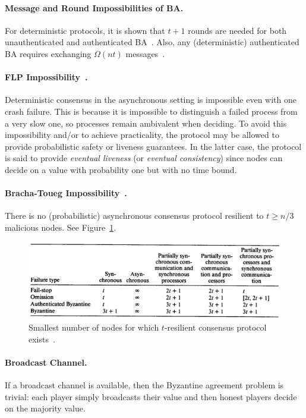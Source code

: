 \documentclass[11pt]{article}
\theoremstyle{mytheoremstyle}
\begin{document}
\paragraph{Message and Round Impossibilities of BA.}
For deterministic protocols, it is shown that $t+1$ rounds are needed for both unauthenticated and authenticated BA~\cite{FischerLynch81,Dolev:1982:STOC}. Also, any (deterministic) authenticated BA requires exchanging $\Omega(nt)$ messages~\cite{dolev:reischuk:82}.

\paragraph{FLP Impossibility~\cite{FLP}.} Deterministic consensus in the asynchronous setting is impossible even with one crash failure. This is because it is impossible to distinguish a failed process from a very slow one, so processes remain ambivalent when deciding. To avoid this impossibility and/or to achieve practicality, the protocol may be allowed to provide probabilistic safety or liveness guarantees. In the latter case, the protocol is said to provide \emph{eventual liveness} (or \emph{eventual consistency}) since nodes can decide on a value with probability one but with no time bound.

\paragraph{Bracha-Toueg Impossibility~\cite{Bracha:Toueg:1983}.} There is no (probabilistic) asynchronous consensus protocol resilient to $t \geq n/3$ malicious nodes. See Figure~\ref{fig:bounds}.

\begin{figure}
	\centering
	\includegraphics[width=0.9\linewidth]{bounds}
	\caption{Smallest number of nodes for which $t$-resilient consensus protocol exists~\cite{dwork:1988:cpp}.}
	\label{fig:bounds}
\end{figure}

\paragraph{Broadcast Channel.} If a broadcast channel is available, then the Byzantine agreement problem is trivial: each player simply broadcasts their value and then honest players decide on the majority value.
\end{document}
